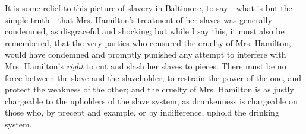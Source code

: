 It is some relief to this picture of slavery in Baltimore, to say---what
is but the simple truth---that Mrs. Hamilton's treatment of her slaves
was generally condemned, as disgraceful and shocking; but while I say
this, it must also be remembered, that the very parties who censured the
cruelty of Mrs. Hamilton, would have condemned and promptly punished any
attempt to interfere with Mrs. Hamilton's \emph{right} to cut and slash
her slaves to pieces. There must be no force between the slave and the
slaveholder, to restrain the power of the one, and protect the weakness
of the other; and the cruelty of Mrs. Hamilton is as justly chargeable
to the upholders of the slave system, as drunkenness is chargeable on
those who, by precept and example, or by indifference, uphold the
drinking system.
